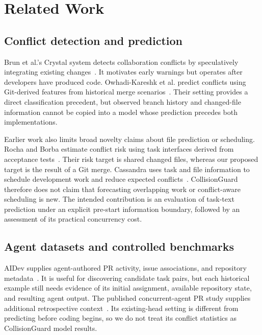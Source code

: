 \documentclass[sigconf,authorversion,nonacm]{acmart}
\begin{document}
\section{Related Work}
\subsection{Conflict detection and prediction}
Brun et al.'s Crystal system detects collaboration conflicts by speculatively integrating existing changes~\cite{brun2011}. It motivates early warnings but operates after developers have produced code. Owhadi-Kareshk et al. predict conflicts using Git-derived features from historical merge scenarios~\cite{owhadi2019}. Their setting provides a direct classification precedent, but observed branch history and changed-file information cannot be copied into a model whose prediction precedes both implementations.

Earlier work also limits broad novelty claims about file prediction or scheduling. Rocha and Borba estimate conflict risk using task interfaces derived from acceptance tests~\cite{rocha2023}. Their risk target is shared changed files, whereas our proposed target is the result of a Git merge. Cassandra uses task and file information to schedule development work and reduce expected conflicts~\cite{kasi2013}. CollisionGuard therefore does not claim that forecasting overlapping work or conflict-aware scheduling is new. The intended contribution is an evaluation of task-text prediction under an explicit pre-start information boundary, followed by an assessment of its practical concurrency cost.

\subsection{Agent datasets and controlled benchmarks}
AIDev supplies agent-authored PR activity, issue associations, and repository metadata~\cite{aidev2026}. It is useful for discovering candidate task pairs, but each historical example still needs evidence of its initial assignment, available repository state, and resulting agent output. The published concurrent-agent PR study supplies additional retrospective context~\cite{xu2026}. Its existing-head setting is different from predicting before coding begins, so we do not treat its conflict statistics as CollisionGuard model results.
\end{document}
